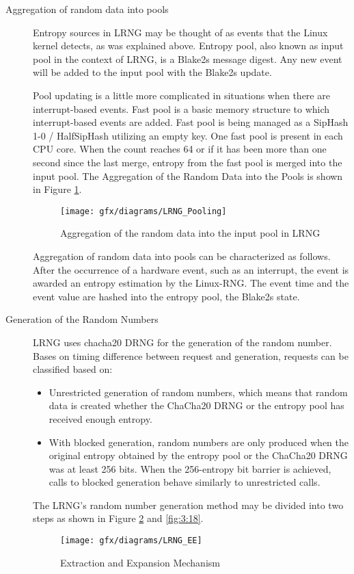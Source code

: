 \begin{description}
	\item[Aggregation of random data into pools] Entropy sources in LRNG may be thought of as events that the Linux kernel detects, as was explained above. Entropy pool, also known as input pool in the context of LRNG, is a Blake2s message digest. Any new event will be added to the input pool with the Blake2s update. 
	
	Pool updating is a little more complicated in situations when there are interrupt-based events. Fast pool is a basic memory structure to which interrupt-based events are added. Fast pool is being managed as a SipHash 1-0 / HalfSipHash utilizing an empty key. One fast pool is present in each CPU core. When the count reaches 64 or if it has been more than one second since the last merge, entropy from the fast pool is merged into the input pool. The Aggregation of the Random Data into the Pools is shown in Figure \ref{fig:3:16}.
	\begin{figure}[htbp]
		\centering
		\texttt{[image: gfx/diagrams/LRNG\_Pooling]}
		\caption{Aggregation of the random data into the input pool in LRNG}
		\label{fig:3:16}
	\end{figure}

	Aggregation of random data into pools can be characterized as follows. After the occurrence of a hardware event, such as an interrupt, the event is awarded an entropy estimation by the Linux-RNG. The event time and the event value are hashed into the entropy pool, the Blake2s state.
	
	\item[Generation of the Random Numbers] LRNG uses chacha20 DRNG for the generation of the random number. Bases on timing difference between request and generation, requests can be classified based on:
	\begin{itemize}
		\item Unrestricted generation of random numbers, which means that random data is created whether the ChaCha20 DRNG or the entropy pool has received enough entropy.
		\item With blocked generation, random numbers are only produced when the original entropy obtained by the entropy pool or the ChaCha20 DRNG was at least 256 bits. When the 256-entropy bit barrier is achieved, calls to blocked generation behave similarly to unrestricted calls.
	\end{itemize}
	
	The LRNG's random number generation method may be divided into two steps as shown in Figure \ref{fig:3:17} and \ref{fig:3:18}.  
	\begin{figure}[htbp]
		\centering
		\texttt{[image: gfx/diagrams/LRNG\_EE]}
		\caption{Extraction and Expansion Mechanism}
		\label{fig:3:17}
	\end{figure}


\end{description}
